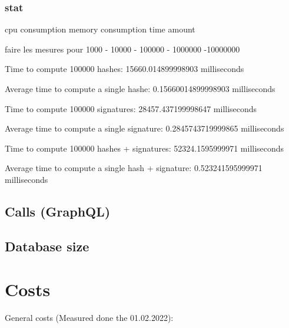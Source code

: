 \documentclass[a4paper,11pt,oneside]{report}
\begin{document}
\subsubsection{stat}
cpu consumption
memory consumption
time amount



faire les mesures pour 1000 - 10000 - 100000 - 1000000 -10000000



Time to compute 100000 hashes: 15660.014899998903 milliseconds

Average time to compute a single hashe: 0.15660014899998903 milliseconds

Time to compute 100000 signatures: 28457.437199998647 milliseconds

Average time to compute a single signature: 0.2845743719999865 milliseconds

Time to compute 100000 hashes + signatures: 52324.1595999971 milliseconds

Average time to compute a single hash + signature: 0.523241595999971 milliseconds

\subsection{Calls (GraphQL)}

\subsection{Database size}

\section{Costs}
General costs (Measured done the 01.02.2022):
\end{document}
